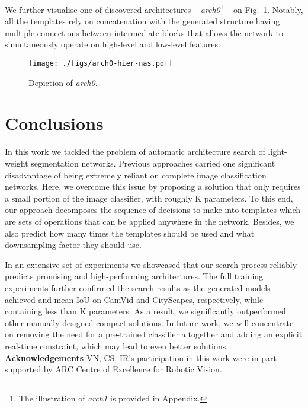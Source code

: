 \documentclass[10pt,twocolumn,letterpaper]{article}
\begin{document}
We further visualise one of discovered architectures -- {\em arch0}\footnote{The illustration of {\em arch1} is provided in Appendix.} -- on Fig.~\ref{fig:arch0}. Notably, all the templates rely on concatenation with the generated structure having multiple connections between intermediate blocks that allows the network to simultaneously operate on high-level and low-level features.


\begin{figure}[thb]
	\begin{center}
		\texttt{[image: ./figs/arch0-hier-nas.pdf]}
	\end{center}
	\vskip -0.1in
	\caption{Depiction of {\em arch0}.\label{fig:arch0}}
	\vskip -0.3in
\end{figure}






\section{Conclusions}
\vskip -0.085in
In this work we tackled the problem of automatic architecture search of light-weight segmentation networks. Previous approaches carried one significant disadvantage of being extremely reliant on complete image classification networks. Here, we overcome this issue by proposing a solution that only requires a small portion of the image classifier, with roughly K parameters. To this end, our approach decomposes the sequence of decisions to make into templates which are sets of operations that can be applied anywhere in the network. Besides, we also predict how many times the templates should be used and what downsampling factor they should use.

In an extensive set of experiments we showcased that our search process reliably predicts promising and high-performing architectures. The full training experiments further confirmed the search results as the generated models achieved  and  mean IoU on CamVid and CityScapes, respectively, while containing less than K parameters. As a result, we significantly outperformed other manually-designed compact solutions. In future work, we will concentrate on removing the need for a pre-trained classifier altogether and adding an explicit real-time constraint, which may lead to even better solutions.\\

\noindent\textbf{Acknowledgements}
    VN, CS, IR's participation in this work were in part supported by ARC Centre of Excellence for Robotic Vision.
\end{document}
